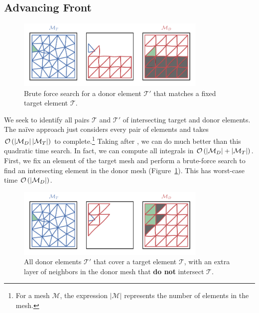 \subsection{Advancing Front}\label{subsec:advancing-front}

\begin{figure}
  \includegraphics[width=0.8125\textwidth]
                  {../images/curved-mesh/main_figure13.pdf}
  \centering
  \captionsetup{width=.75\linewidth}
  \caption{Brute force search for a donor element \(\mathcal{T}'\) that matches
    a fixed target element \(\mathcal{T}\).}
  \label{fig:target-elt-brute-force}
\end{figure}

We seek to identify all pairs \(\mathcal{T}\) and \(\mathcal{T}'\) of
intersecting target and donor elements. The na\"{i}ve approach just
considers every pair
of elements and takes \(\mathcal{O}\left(\left|\mathcal{M}_D\right|
\left|\mathcal{M}_T\right|\right)\) to complete.\footnote{For a mesh \(\mathcal{M}\),
the expression \(\left|\mathcal{M}\right|\) represents the number of elements
in the mesh.} Taking after \cite{Farrell2011}, we can do much better than this
quadratic time search. In fact, we can compute all integrals in
\(\mathcal{O}\left(\left|\mathcal{M}_D\right| + \left|\mathcal{M}_T\right|\right)\).
First, we fix an element of the target mesh and perform a brute-force search
to find an intersecting element in the donor mesh
(Figure~\ref{fig:target-elt-brute-force}). This has worst-case time
\(\mathcal{O}\left(\left|\mathcal{M}_D\right|\right)\).

\begin{figure}
  \includegraphics[width=0.8125\textwidth]
                  {../images/curved-mesh/main_figure14.pdf}
  \centering
  \captionsetup{width=.75\linewidth}
  \caption{All donor elements \(\mathcal{T}'\) that cover a target element
    \(\mathcal{T}\), with an extra layer of neighbors in the donor mesh
    that \textbf{do not} intersect \(\mathcal{T}\).}
  \label{fig:target-elt-overlap-extra-layer}
\end{figure}

